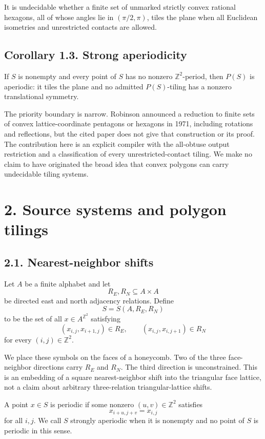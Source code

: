 \documentclass[11pt]{article}
\begin{document}
It is undecidable whether a finite set of unmarked strictly convex rational
hexagons, all of whose angles lie in \((\pi/2,\pi)\), tiles the plane when all
Euclidean isometries and unrestricted contacts are allowed.

\subsection*{Corollary 1.3. Strong aperiodicity}

If \(S\) is nonempty and every point of \(S\) has no nonzero
\(\mathbb Z^2\)-period, then \(P(S)\) is aperiodic: it tiles the plane and no
admitted \(P(S)\)-tiling has a nonzero translational symmetry.

The priority boundary is narrow. Robinson announced a reduction to finite
sets of convex lattice-coordinate pentagons or hexagons in 1971, including
rotations and reflections, but the cited paper does not give that
construction or its proof. The contribution here is an explicit compiler
with the all-obtuse output restriction and a classification of every
unrestricted-contact tiling. We make no claim to have originated the broad
idea that convex polygons can carry undecidable tiling systems.

\section*{2. Source systems and polygon tilings}

\subsection*{2.1. Nearest-neighbor shifts}

Let \(A\) be a finite alphabet and let
\[
  R_E,R_N\subseteq A\times A
\]
be directed east and north adjacency relations. Define
\[
S=S(A,R_E,R_N)
\]
to be the set of all \(x\in A^{\mathbb Z^2}\) satisfying
\[
  (x_{i,j},x_{i+1,j})\in R_E,\qquad
  (x_{i,j},x_{i,j+1})\in R_N
\]
for every \((i,j)\in\mathbb Z^2\).

We place these symbols on the faces of a honeycomb. Two of the three
face-neighbor directions carry \(R_E\) and \(R_N\). The third direction is
unconstrained. This is an embedding of a square nearest-neighbor shift into
the triangular face lattice, not a claim about arbitrary three-relation
triangular-lattice shifts.

A point \(x\in S\) is periodic if some nonzero
\((u,v)\in\mathbb Z^2\) satisfies
\[
  x_{i+u,j+v}=x_{i,j}
\]
for all \(i,j\). We call \(S\) strongly aperiodic when it is nonempty and no
point of \(S\) is periodic in this sense.
\end{document}
